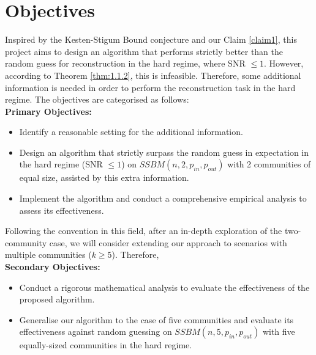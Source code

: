 \section{Objectives}
Inspired by the Kesten-Stigum Bound conjecture and our Claim \ref{claim1}, this project aims to design an algorithm that performs strictly better than the random guess for reconstruction in the hard regime, where SNR $\leq1$. However, according to Theorem \ref{thm:1.1.2}, this is infeasible. Therefore, some additional information is needed in order to perform the reconstruction task in the hard regime. The objectives are categorised as follows:\vspace{2mm}\\
\textbf{Primary Objectives:}
\begin{itemize}
    \item Identify a reasonable setting for the additional information.
    \item Design an algorithm that strictly surpass the random guess in expectation in the hard regime (SNR $\leq1$) on $SSBM(n, 2, p_{in}, p_{out})$ with 2 communities of equal size, assisted by this extra information.
    \item Implement the algorithm and conduct a comprehensive empirical analysis to assess its effectiveness.
\end{itemize}
Following the convention in this field, after an in-depth exploration of the two-community case, we will consider extending our approach to scenarios with multiple communities ($k \geq 5$). Therefore, \vspace{2mm}\\
\textbf{Secondary Objectives:}
\begin{itemize}
    \item Conduct a rigorous mathematical analysis to evaluate the effectiveness of the proposed algorithm.
    \item Generalise our algorithm to the case of five communities and evaluate its effectiveness against random guessing on $SSBM(n, 5, p_{in}, p_{out})$ with five equally-sized communities in the hard regime.
\end{itemize}
